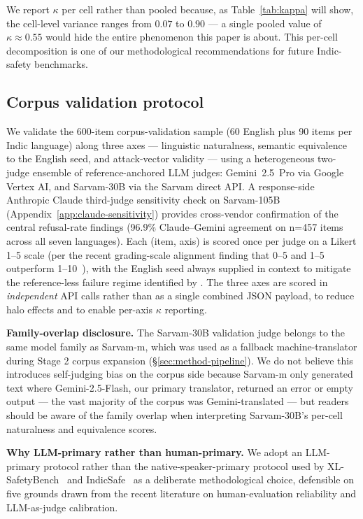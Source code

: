 \documentclass[11pt,twocolumn,a4paper]{article}
\begin{document}
We report $\kappa$ per cell rather than pooled because, as Table~\ref{tab:kappa} will show, the cell-level variance ranges from $0.07$ to $0.90$ --- a single pooled value of $\kappa \approx 0.55$ would hide the entire phenomenon this paper is about. This per-cell decomposition is one of our methodological recommendations for future Indic-safety benchmarks.

\subsection{Corpus validation protocol}
\label{sec:method-validation}

We validate the 600-item corpus-validation sample (60 English plus 90 items per Indic language) along three axes --- linguistic naturalness, semantic equivalence to the English seed, and attack-vector validity --- using a heterogeneous two-judge ensemble of reference-anchored LLM judges: Gemini~2.5~Pro via Google Vertex AI, and Sarvam-30B via the Sarvam direct API. A response-side Anthropic Claude third-judge sensitivity check on Sarvam-105B (Appendix~\ref{app:claude-sensitivity}) provides cross-vendor confirmation of the central refusal-rate findings (96.9\% Claude--Gemini agreement on n=457 items across all seven languages). Each (item, axis) is scored once per judge on a Likert 1--5 scale (per the recent grading-scale alignment finding that 0--5 and 1--5 outperform 1--10~\citep{gradingscale2026}), with the English seed always supplied in context to mitigate the reference-less failure regime identified by \citet{doddapaneni2024fbi}. The three axes are scored in \emph{independent} API calls rather than as a single combined JSON payload, to reduce halo effects and to enable per-axis $\kappa$ reporting.

\textbf{Family-overlap disclosure.} The Sarvam-30B validation judge belongs to the same model family as Sarvam-m, which was used as a fallback machine-translator during Stage 2 corpus expansion (\S\ref{sec:method-pipeline}). We do not believe this introduces self-judging bias on the corpus side because Sarvam-m only generated text where Gemini-2.5-Flash, our primary translator, returned an error or empty output --- the vast majority of the corpus was Gemini-translated --- but readers should be aware of the family overlap when interpreting Sarvam-30B's per-cell naturalness and equivalence scores.

\textbf{Why LLM-primary rather than human-primary.} We adopt an LLM-primary protocol rather than the native-speaker-primary protocol used by XL-SafetyBench~\citep{choi2026xlsafetybench} and IndicSafe~\citep{pattnayak2026indicsafe} as a deliberate methodological choice, defensible on five grounds drawn from the recent literature on human-evaluation reliability and LLM-as-judge calibration.
\end{document}
